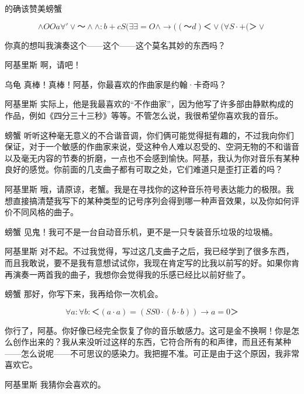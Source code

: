 \begin{dialog}{的确该赞美螃蟹}
\begin{dialogue}
\[
∧OOa\forall '∨～∧∧:b+cS(\exists \exists =O∧→((～d)＜∨(\forall S\cdot +(＞∨
\]


你真的想叫我演奏这个——这个——这个莫名其妙的东西吗？

\item[阿基里斯]啊，请吧！


\item[乌龟]真棒！真棒！阿基，你最喜欢的作曲家是约翰·卡奇吗？

\item[阿基里斯]实际上，他是我最喜欢的“不作曲家”，因为他写了许多部由静默构成的作品，例如《四分三十三秒》等等。不管怎么说，我很希望你喜欢我的音乐。

\item[螃蟹]听听这种毫无意义的不合谐音调，你们俩可能觉得挺有趣的，不过我向你们保证，对于一个敏感的作曲家来说，受这种令人难以忍受的、空洞无物的不和谐音以及毫无内容的节奏的折磨，一点也不会感到愉快。阿基，我认为你对音乐有某种良好的感觉。你前面的几支曲子都有可取之处，它们难道只是歪打正着的吗？

\item[阿基里斯]哦，请原谅，老蟹。我是在寻找你的这种音乐符号表达能力的极限。我想直接搞清楚我写下的某种类型的记号序列会得到哪一种声音效果，以及你如何评价不同风格的曲子。

\item[螃蟹]见鬼！我可不是一台自动音乐机，更不是一只专装音乐垃圾的垃圾桶。

\item[阿基里斯]对不起。不过我觉得，写过这几支曲子之后，我已经学到了很多东西，而且我敢说，要不是我有意想试试你，我现在肯定写的比我以前写的好。如果你肯再演奏一两首我的曲子，我想你会觉得我的乐感已经比以前好些了。

\item[螃蟹]那好，你写下来，我再给你一次机会。

\[
\forall a:\forall b:＜(a\cdot a)=(SS0\cdot (b\cdot b))→a=0＞
\]

你行了，阿基。你好像已经完全恢复了你的音乐敏感力。这可是金不换啊！你是怎么创作出来的？我从来没听过这样的东西，它符合所有的和声律，而且还有某种——怎么说呢——不可思议的感染力。我把握不准。可正是由于这个原因，我非常喜欢它。

\item[阿基里斯]我猜你会喜欢的。


\end{dialogue}
\end{dialog}
